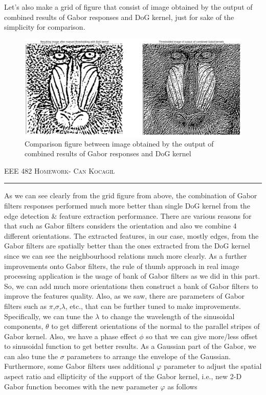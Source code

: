\documentclass[12pt]{amsart}
\begin{document}
Let's also make a grid of figure that consist of image obtained by the output of combined results of Gabor responses and DoG kernel, just for sake of the simplicity for comparison.


\begin{figure}[ht]
    \centering
    \includegraphics[width = 1\textwidth]{images/last.png}
    \caption{Comparison figure between image obtained by the output of combined results of Gabor responses and DoG kernel}
\end{figure}

\newpage
{\scshape EEE 482} \hfill {\scshape \large  Homework-\relax} \hfill {\scshape Can Kocagil}
\smallskip
\hrule
\vspace{2mm}

As we can see clearly from the grid figure from above, the combination of Gabor filters responses performed much more better than single DoG kernel from the edge detection \& feature extraction performance. There are various reasons for that such as Gabor filters considers the orientation and also we combine 4 different orientations. The extracted features, in our case, mostly edges, from the Gabor filters are spatially better than the ones extracted from the DoG kernel since we can see the neighbourhood relations much more clearly. As a further improvements onto Gabor filters, the rule of thumb approach in real image processing application is the usage of bank of Gabor filters as we did in this part. So, we can add much more orientations then construct a bank of Gabor filters to improve the features quality. Also, as we saw, there are parameters of Gabor filters such as $\pi$,$\sigma$,$\lambda$, etc., that can be further tuned to make improvements. Specifically, we can tune the $\lambda$ to change the wavelength of the sinusoidal components, $\theta$ to get different orientations of the normal to the parallel stripes of Gabor kernel. Also, we have a phase effect $\phi$ so that we can give more/less offset to sinusoidal function to get better results. As a Gaussian part of the Gabor, we can also tune the $\sigma$ parameters to arrange the envelope of the Gaussian. Furthermore, some Gabor filters uses additional $\varphi$ parameter to adjust the spatial aspect ratio and ellipticity of the support of the Gabor kernel, i.e., new 2-D Gabor function becomes with the new parameter $\varphi$ as follows
\end{document}
